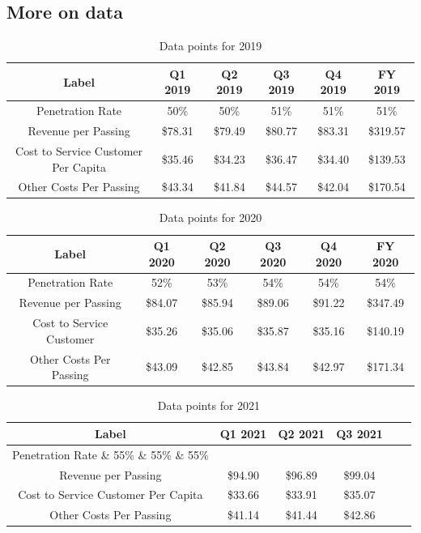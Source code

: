 \documentclass[a4paper,oneside]{article}
\begin{document}

	
\begin{appendices}

\pagebreak	
\section{More on data}\label{app:dat}
\pagebreak
\begin{table}%
	\centering
	\begin{tabular}{cccccc} 
		\toprule
		Label & Q1 2019 & Q2 2019 & Q3 2019 & Q4 2019 & FY 2019 \\
		\midrule
		Penetration Rate & 50\% & 50\% & 51\% & 51\% & 51\% \\
		Revenue per Passing & \$78.31 & \$79.49 & \$80.77 & \$83.31 & \$319.57 \\
		Cost to Service Customer Per Capita & \$35.46 & \$34.23 & \$36.47 & \$34.40 & \$139.53 \\
		Other Costs Per Passing & \$43.34 & \$41.84 & \$44.57 & \$42.04 & \$170.54 \\
		\bottomrule
	\end{tabular}
	\caption{Data points for 2019}
	\label{tab:myt1}
\end{table}
\begin{table}%
	\centering
	\begin{tabular}{cccccc} %
		\toprule			
			Label & Q1 2020 & Q2 2020 & Q3 2020 & Q4 2020 & FY 2020 \\
		\midrule
			Penetration Rate & 52\% & 53\% & 54\% & 54\% & 54\% \\
			Revenue per Passing & \$84.07 & \$85.94 & \$89.06 & \$91.22 & \$347.49 \\
			Cost to Service Customer & \$35.26 & \$35.06 & \$35.87 & \$35.16 & \$140.19 \\
			Other Costs Per Passing & \$43.09 & \$42.85 & \$43.84 & \$42.97 & \$171.34 \\
		\bottomrule
	\end{tabular}
	\caption{Data points for 2020}
	\label{tab:myt2}
\end{table}
\begin{table}%
	\centering
	\begin{tabular}{cccccc}\hline %
		\toprule			
		Label & Q1 2021 & Q2 2021 & Q3 2021 \\
		\midrule
			Penetration Rate \& 55\% \& 55\% \& 55\% \\
			Revenue per Passing & \$94.90 & \$96.89 & \$99.04 \\
			Cost to Service Customer Per Capita & \$33.66 & \$33.91 & \$35.07 \\
			Other Costs Per Passing & \$41.14 & \$41.44 & \$42.86 \\
		\bottomrule
	\end{tabular}
	\caption{Data points for 2021}
	\label{tab:myt3}
\end{table}
\:\:\:\:\:\:\:\:\:\:\:
\pagebreak

\end{appendices}
\end{document}
